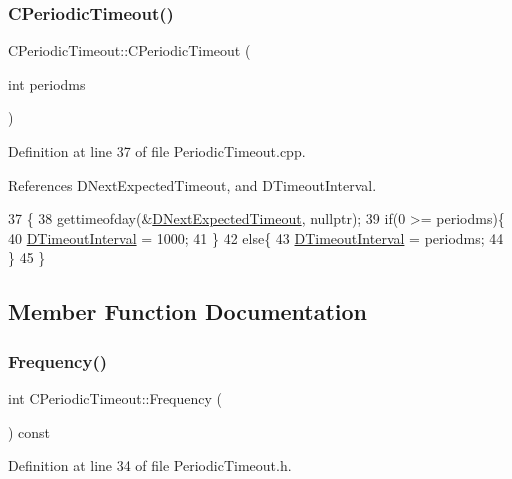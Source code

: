 \subsubsection{\texorpdfstring{C\+Periodic\+Timeout()}{CPeriodicTimeout()}}
{\footnotesize\ttfamily C\+Periodic\+Timeout\+::\+C\+Periodic\+Timeout (\begin{DoxyParamCaption}\item[{int}]{periodms }\end{DoxyParamCaption})}



Definition at line 37 of file Periodic\+Timeout.\+cpp.



References D\+Next\+Expected\+Timeout, and D\+Timeout\+Interval.


\begin{DoxyCode}
37                                               \{
38     gettimeofday(&\hyperlink{classCPeriodicTimeout_ae85c3dd7526ee6b538b7c6478133013c}{DNextExpectedTimeout}, \textcolor{keyword}{nullptr});
39     \textcolor{keywordflow}{if}(0 >= periodms)\{
40         \hyperlink{classCPeriodicTimeout_ab0c2b821c02366c9638a66eced3c1f34}{DTimeoutInterval} = 1000;        
41     \}
42     \textcolor{keywordflow}{else}\{
43         \hyperlink{classCPeriodicTimeout_ab0c2b821c02366c9638a66eced3c1f34}{DTimeoutInterval} = periodms;    
44     \}
45 \}
\end{DoxyCode}


\subsection{Member Function Documentation}
\hypertarget{classCPeriodicTimeout_af5a198bf926337b0f4470d0b77bca542}{}\label{classCPeriodicTimeout_af5a198bf926337b0f4470d0b77bca542} 
\subsubsection{\texorpdfstring{Frequency()}{Frequency()}}
{\footnotesize\ttfamily int C\+Periodic\+Timeout\+::\+Frequency (\begin{DoxyParamCaption}{ }\end{DoxyParamCaption}) const\hspace{0.3cm}{\ttfamily [inline]}}



Definition at line 34 of file Periodic\+Timeout.\+h.



